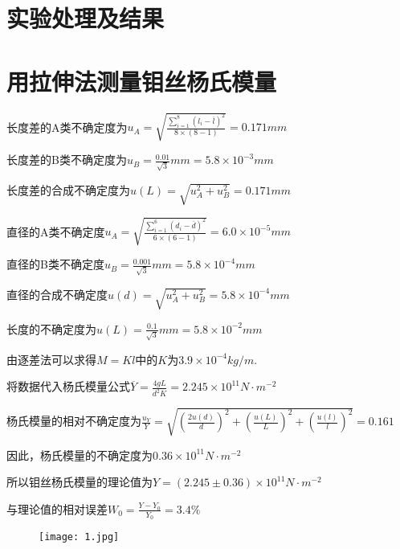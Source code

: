 \documentclass[12pt,a4paper]{article}
\begin{document}
\section{实验处理及结果}
    \section{用拉伸法测量钼丝杨氏模量}
    长度差的A类不确定度为${u_A} = \sqrt {\frac{{\sum\limits_{i = 1}^8 {{{\left( {l_i - \overline l } \right)}^2}} }}{{8 \times \left( {8 - 1} \right)}}}  = 0.171mm$\par
    长度差的B类不确定度为$ {u_B} = \frac{{0.01}}{{\sqrt 3 }}mm= 5.8 \times {10^{ - 3}}mm$ \par
    长度差的合成不确定度为$u\left( L \right) = \sqrt {u_A^2 + u_B^2}  = 0.171mm$\par
    直径的A类不确定度${u_A} = \sqrt {\frac{{\sum\limits_{i = 1}^6 {{{\left( {{d_i} - \overline d } \right)}^2}} }}{{6 \times \left( {6 - 1} \right)}}}  = 6.0 \times {10^{ - 5}}mm$\par
    直径的B类不确定度${u_B} = \frac{{0.001}}{{\sqrt 3 }}mm = 5.8 \times {10^{ - 4}}mm$\par
    直径的合成不确定度$u\left( d \right) = \sqrt {u_A^2 + u_B^2}  = 5.8 \times {10^{ - 4}}mm$\par
    长度的不确定度为$u\left( L \right) = \frac{{0.1}}{{\sqrt 3 }}mm = 5.8 \times {10^{ - 2}}mm$\par

    由逐差法可以求得$M=Kl$中的$K$为$ 3.9 \times {10^{ - 4}} kg/m$.\par
    将数据代入杨氏模量公式$\overline Y  = \frac{4gL}{{{d^2}K}} = 2.245 \times {10^{11}}N \cdot {m^{ - 2}}$\par

    杨氏模量的相对不确定度为$\frac{{{u_Y}}}{Y} = \sqrt {{{\left( {\frac{{2u\left( d \right)}}{d}} \right)}^2} + {{\left( {\frac{{u\left( L \right)}}{L}} \right)}^2} + {{\left( {\frac{{u\left( l \right)}}{l}} \right)}^2} }  = 0.161$\par
    因此，杨氏模量的不确定度为$ 0.36 \times {10^{ 11}}N \cdot {m^{ - 2}}$\par
    所以钼丝杨氏模量的理论值为$Y = \left( {2.245 \pm 0.36} \right) \times {10^{ 11}}N \cdot {m^{ - 2}}$\par
    与理论值的相对误差${W_0} = \frac{{Y - {Y_0}}}{{{Y_0}}} = 3.4\% $

    \begin{figure}[H]
        \centering
        \texttt{[image: 1.jpg]}
    \end{figure}
\end{document}
